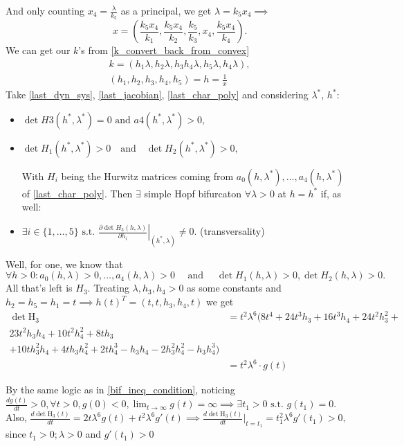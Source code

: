 And only counting $x_4 = \frac{\lambda}{k_5}$ as a principal, we get $\lambda = k_5 x_4 \implies$
\begin{equation}\label{last_char_poly}
	x =
	\left(\frac{k_5x_4}{k_1},\frac{k_5x_4}{k_2},\frac{k_5}{k_3},x_4,\frac{k_5x_4}{k_4}\right).	
\end{equation}
We can get our $k$'s from \ref{k_convert_back_from_convex}
\begin{gather*}
	k =
	\left(h_1 \lambda, h_2 \lambda, h_3 h_4 \lambda, h_5 \lambda, h_4 \lambda\right), \\
	\left(h_1, h_2, h_3, h_4, h_5\right)
	= h = \frac{1}{x}
\end{gather*}
Take \ref{last_dyn_sys}, \ref{last_jacobian}, \ref{last_char_poly} and considering $\lambda^*$, $h^* :$
\begin{itemize}
	\item {} $\det H3(h^*, \lambda^*) = 0 \text{ and } a4(h^*, \lambda^*) > 0,$
	\item {} $\det H_1(h^*,\lambda^*)>0\quad\mathrm{and}\quad\det H_2(h^*,\lambda^*)>0,$

		With $H_i$ being the Hurwitz matrices coming from $a_0(h,\lambda^*), \ldots, a_4(h, \lambda^*)$ of \ref{last_char_poly}.
		Then $\exists$ simple Hopf bifurcaton $\forall \lambda>0$ at $h = h^*$ if, as well:

	\item {} $\exists i\in\{1,\ldots,5\}\text{ s.t. }\left.\frac{\partial\det H_3(h,\lambda)}{\partial h_i}\right|_{(h^*,\lambda)}\neq0.$ (transversality)
\end{itemize}

Well, for one, we know that
\[
	\forall h > 0 : a_{0}(h,\lambda)>0,\ldots,a_{4}(h,\lambda)>0\quad \text{ and } \quad\det H_{1}(h,\lambda)>0,\det H_{2}(h,\lambda)>0.
\]
All that's left is $H_3$. Treating $\lambda, h_3, h_4 > 0$ as some constants and $h_2 = h_5 = h_1 = t \implies h(t)^T = (t,t,h_3,h_4,t)$ we get
\begin{align*}
	\det \text{H}_3 &=
	t^2 \lambda^6
	(
		8t^4 + 24t^3h_3 + 16t^3h_4 + 24t^2h_3^2 + \\
		23t^2h_3h_4+ 10t^2h_4^2 + 8th_3 \\
		+ 10th_3^2h_4 + 4th_3h_4^2 +
		2th_4^3 - h_3h_4 - 2h_3^2h_4^2 - h_3h_4^3
	) \\
	&= 	t^2 \lambda^6 \cdot g(t)
\end{align*}

By the same logic as in \ref{bif_ineq_condition}, noticing $\frac{ d g(t) }{dt} > 0, \forall t > 0,  g(0) < 0, \lim_{t \rightarrow \infty}  g(t) = \infty \implies \exists t_1 > 0 \text{ s.t. }  g(t_1) = 0$.
Also, $\frac{d  \det \text{H}_3(t) }{dt} = 2 t \lambda^6 g(t) + t^2 \lambda^6 g'(t) \implies \frac{d  \det \text{H}_3(t) }{dt} |_{t = t_1}  = t_1^2 \lambda^6 g'(t_1) > 0,$ since $t_1 > 0; \lambda > 0$ and $g'(t_1) > 0$


